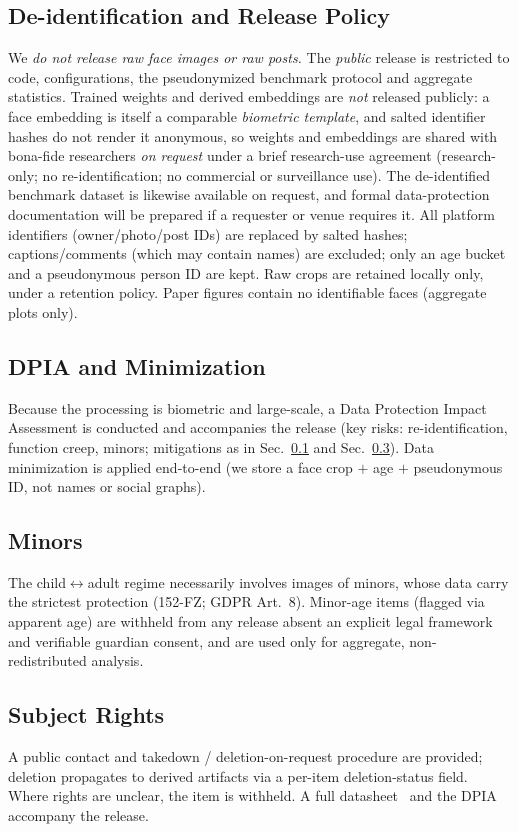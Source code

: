 \documentclass[journal]{IEEEtran}
\begin{document}
\subsection{De-identification and Release Policy}\label{sec:eth-deid}
We \emph{do not release raw face images or raw posts.} The \emph{public} release is restricted to code, configurations, the pseudonymized benchmark protocol and aggregate statistics. Trained weights and derived embeddings are \emph{not} released publicly: a face embedding is itself a comparable \emph{biometric template}, and salted identifier hashes do not render it anonymous, so weights and embeddings are shared with bona-fide researchers \emph{on request} under a brief research-use agreement (research-only; no re-identification; no commercial or surveillance use). The de-identified benchmark dataset is likewise available on request, and formal data-protection documentation will be prepared if a requester or venue requires it. All platform identifiers (owner/photo/post IDs) are replaced by salted hashes; captions/comments (which may contain names) are excluded; only an age bucket and a pseudonymous person ID are kept. Raw crops are retained locally only, under a retention policy. Paper figures contain no identifiable faces (aggregate plots only).

\subsection{DPIA and Minimization}\label{sec:eth-dpia}
Because the processing is biometric and large-scale, a Data Protection Impact Assessment is conducted and accompanies the release (key risks: re-identification, function creep, minors; mitigations as in Sec.~\ref{sec:eth-deid} and Sec.~\ref{sec:eth-minors}). Data minimization is applied end-to-end (we store a face crop $+$ age $+$ pseudonymous ID, not names or social graphs).

\subsection{Minors}\label{sec:eth-minors}
The child$\leftrightarrow$adult regime necessarily involves images of minors, whose data carry the strictest protection (152-FZ; GDPR Art.~8). Minor-age items (flagged via apparent age) are withheld from any release absent an explicit legal framework and verifiable guardian consent, and are used only for aggregate, non-redistributed analysis.

\subsection{Subject Rights}\label{sec:eth-rights}
A public contact and takedown / deletion-on-request procedure are provided; deletion propagates to derived artifacts via a per-item deletion-status field. Where rights are unclear, the item is withheld. A full datasheet~\cite{gebru2021datasheets} and the DPIA accompany the release.
\end{document}
